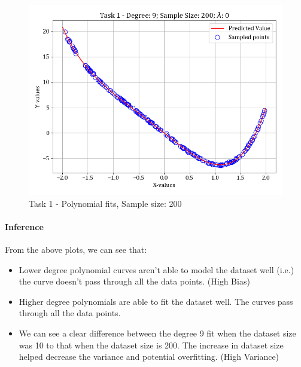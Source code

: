 \documentclass[12pt,a4paper]{article}
\begin{document}
\begin{figure}[H]
    \includegraphics[scale=0.425]{images/t1_d1/d_9_size_200_l_0.png}
    \caption{Task 1 - Polynomial fits, Sample size: 200}
\end{figure}

\paragraph{Inference}
From the above plots, we can see that:
\begin{itemize}
    \itemsep0em
    \item Lower degree polynomial curves aren't able to model the dataset well (i.e.) the curve doesn't pass through all the data points. (High Bias)
    \item Higher degree polynomials are able to fit the dataset well. The curves pass through all the data points.
    \item We can see a clear difference between the degree 9 fit when the dataset size was 10 to that when the dataset size is 200. The increase in dataset size helped decrease the variance and potential overfitting. (High Variance)
\end{itemize}
\end{document}
